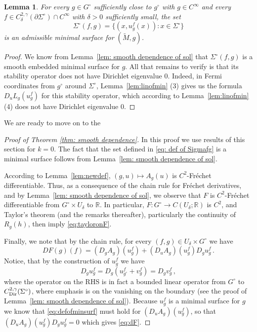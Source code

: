 \documentclass[11pt]{amsart}
\newtheorem{Lemma}[Theorem]{Lemma}
\theoremstyle{definition}
\numberwithin{equation}{section}
\newcommand{\mR}{\mathbb{R}}                    %
\begin{document}
\begin{Lemma}\label{lem:newminsurf}
    For every $g \in G^\circ$ sufficiently close to $g^\circ$ with $g\in C^\infty$ and every $f\in C^{2,\gamma}_\delta(\partial\Sigma^\circ)\cap C^\infty$ with $\delta>0$ sufficiently small, the set
    \[
        \Sigma^\circ(f,g) = \{(x,u^f_{g}(x))\colon x\in \Sigma^\circ\}
    \]
    is an admissible minimal surface for $(\widetilde{M},g)$.
\end{Lemma}
\begin{proof}
    We know from Lemma~\ref{lem: smooth dependence of sol} that $\Sigma^\circ(f,g)$ is a smooth embedded minimal surface for $g$. All that remains to verify is that its stability operator does not have Dirichlet eigenvalue $0$. Indeed, in Fermi coordinates from $g^\circ$ around $\Sigma^\circ$, Lemma~\ref{lem:linofmin} (3) gives us the formula $D_u L_{g}(u^f_{g})$ for this stability operator, which according to Lemma~\ref{lem:linofmin} (4) does not have Dirichlet eigenvalue $0$.
\end{proof}

We are ready to move on to the
\begin{proof}[Proof of Theorem \ref{thm: smooth dependence}]
In this proof we use results of this section for $k=0$. The fact that the set defined in \eqref{eq: def of Sigmafg} is a minimal surface follows from Lemma~\ref{lem: smooth dependence of sol}.

According to Lemma~\ref{lem:newdef}, $(g,u) \mapsto A_{g}(u)$ is $C^{2}$-Fr\'echet differentiable. Thus, as a consequence of the chain rule for Fr\'echet derivatives, and by Lemma~\ref{lem: smooth dependence of sol}, we observe %
that $F$ is $C^{2}$-Fr\'echet differentiable from $G^\circ \times U_\delta$ to $\mR$. In particular, $F \colon G^\circ \to C(U_\delta;\mR)$ is $C^2$, and Taylor's theorem \cite[Thm.~2.4.15]{MR960687} (and the remarks thereafter), particularly the continuity of $R_{g}(h)$, then imply \eqref{eq:tayloronF}. 

Finally, we note that by the chain rule, for every $(f,g)\in U_\delta\times G^\circ$ we have
\[
	DF(g)(f) =  (D_{g}A_{g})(u_{g}^f) + (D_u A_{g})(u_{g}^f)D_{g} u^f_{g}\,.
\]
Notice, that by the construction of $u^f_{g}$ we have
\[
	D_{g} u^f_{g} = D_{g}(u^f_{g^\circ}+ v^f_{g}) = D_{g} v^f_{g}\,,
\]
where the operator on the RHS is in fact a bounded linear operator from $G^\circ$ to $C^{2,\gamma}_{\rm Dir}(\Sigma^\circ)$, where emphasis is on the vanishing on the boundary (see the proof of Lemma~\ref{lem: smooth dependence of sol}). Because $u^f_{g}$ is a minimal surface for $g$ we know that \eqref{eq:defofminsurf} must hold for $(D_u A_{g})(u_{g}^f)$, so that $(D_u A_{g})(u_{g}^f)D_{g} u^f_{g}=0$ which gives \eqref{eq:dF}.
\end{proof}
\end{document}
